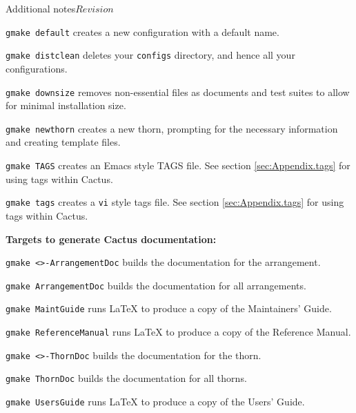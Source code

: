 \begin{cactuspart}{Additional notes}{}{$Revision$}
\begin{Lentry}
\item [\texttt{gmake default}] creates a new configuration with a default name.

\item [\texttt{gmake distclean}] deletes your \texttt{configs} directory, and hence all your configurations.

\item [\texttt{gmake downsize}] removes non-essential files as documents
  and test suites to allow for minimal installation size.

\item [\texttt{gmake newthorn}] creates a new thorn, prompting for the necessary
  information and creating template files.

\item [\texttt{gmake TAGS}] creates an Emacs style TAGS file. See section
  \ref{sec:Appendix.tags} for using tags within Cactus.

\item [\texttt{gmake tags}] creates a \texttt{vi} style tags file. See section
  \ref{sec:Appendix.tags} for using tags within Cactus.

\end{Lentry}

{\bf Targets to generate Cactus documentation:}
\label{sec:OtherGmakeTargetsDoc}

\begin{Lentry}

\item[\texttt{gmake <\var{arrangement}>-ArrangementDoc}] builds the
documentation for the arrangement.

\item[\texttt{gmake ArrangementDoc}] builds the documentation for all
arrangements.

\item [\texttt{gmake MaintGuide}] runs LaTeX to produce a copy of the
Maintainers' Guide.

\item [\texttt{gmake ReferenceManual}] runs LaTeX to produce a copy of the
Reference Manual.

\item[\texttt{gmake <\var{thorn}>-ThornDoc}] builds the documentation for the
thorn.

\item[\texttt{gmake ThornDoc}] builds the documentation for all thorns.

\item [\texttt{gmake UsersGuide}] runs LaTeX to produce a copy of the Users'
Guide.


\end{Lentry}
\end{cactuspart}
